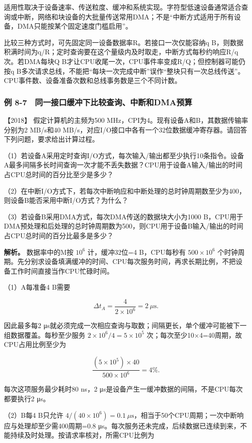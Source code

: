 适用性取决于设备速率、传送粒度、缓冲和系统实现。字符型低速设备通常适合查询或中断，网络和块设备的大批量传送常用DMA；不是``中断方式适用于所有设备，DMA只能按某个固定速度门槛启用''。

比较三种方式时，可先固定同一设备数据率R。若接口一次仅能容纳q B，则数据积满时间为q/R；定时查询要在这个量级内及时取走，中断方式每秒约响应R/q次。若DMA每块Q B才让CPU收尾一次，CPU事件率变成R/Q；但控制器可能仍按q B多次请求总线，不能把``每块一次完成中断''误作``整块只有一次总线传送''。CPU事件数、设备准备次数和总线事务数是三个不同计数。

\subsubsection{例 8-7　同一接口缓冲下比较查询、中断和DMA预算}\label{co-ex8-7}

\noindent{}【2018】 假定计算机的主频为500 MHz，CPI为4。现有设备A和B，其数据传输率分别为2 MB/s和40 MB/s，对应I/O接口中各有一个32位数据缓冲寄存器。请回答下列问题，要求给出计算过程。

（1）若设备A采用定时查询I/O方式，每次输入/输出都至少执行10条指令。设备A最多间隔多长时间查询一次才能不丢失数据？CPU用于设备A输入/输出的时间占CPU总时间的百分比至少是多少？

（2）在中断I/O方式下，若每次中断响应和中断处理的总时钟周期数至少为400，则设备B能否采用中断I/O方式？为什么？

（3）若设备B采用DMA方式，每次DMA传送的数据块大小为1000 B，CPU用于DMA预处理和后处理的总时钟周期数为500，则CPU用于设备B输入/输出的时间占CPU总时间的百分比最多是多少？


\textbf{解析。} 数据率中的M按 \(10^6\) 计，缓冲32位=4 B，CPU每秒有 \(500\times10^6\) 个时钟周期。先分别求设备填满缓冲的时间、CPU每次服务时间，再求长期比例，不把设备工作时间直接当作CPU忙碌时间。

（1）A每准备4 B需要

\[
\Delta t_A=\frac4{2\times10^6}=2\ \mu\mathrm s.
\]

因此最多每2 μs就必须完成一次相应查询与取数；间隔更长，单个缓冲可能被下一组数据覆盖。每秒至少服务 \(2\times10^6/4=5\times10^5\) 次；每次至少10×4=40周期，故CPU占用比例至少为

\[
\frac{(5\times10^5)\times40}{500\times10^6}=4\%.
\]

每次这项服务最少耗时80 ns，2 μs是设备产生一缓冲数据的间隔，不是CPU每次都要执行2 μs。

（2）B每4 B只允许 \(4/(40\times10^6)=0.1\ \mu\mathrm s\)，相当于50个CPU周期；一次中断响应与处理却至少需400周期=0.8 μs。每次服务还未完成，后续数据已连续到来，不能持续及时处理。按请求率核对，所需CPU比例为

